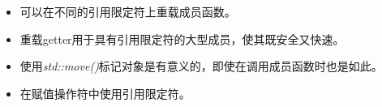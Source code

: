 \begin{itemize}
	\item 可以在不同的引用限定符上重载成员函数。
	\item 重载getter用于具有引用限定符的大型成员，使其既安全又快速。
	\item 使用\textit{std::move()}标记对象是有意义的，即使在调用成员函数时也是如此。
	\item 在赋值操作符中使用引用限定符。
\end{itemize}


